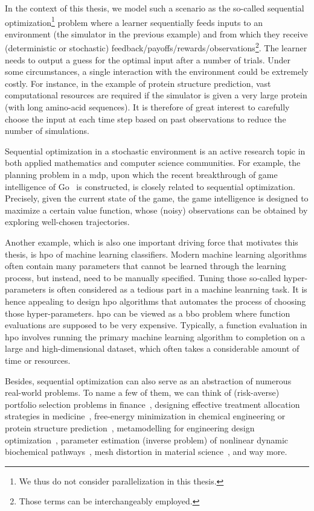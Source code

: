 In the context of this thesis, we model such a scenario as the so-called \gls{sequential optimization}\footnote{We thus do not consider parallelization in this thesis.} problem where a learner sequentially feeds inputs to an environment (the simulator in the previous example) and from which they receive (deterministic or stochastic) feedback/payoffs/rewards/observations\footnote{Those terms can be interchangeably employed.}. The learner needs to output a guess for the optimal input after a number of trials. Under some circumstances, a single interaction with the environment could be extremely costly. For instance, in the example of protein structure prediction, vast computational resources are required if the simulator is given a very large protein (with long amino-acid sequences). It is therefore of great interest to carefully choose the input at each time step based on past observations to reduce the number of simulations.

Sequential optimization in a stochastic environment is an active research topic in both applied mathematics and computer science communities. For example, the planning problem in a \gls{mdp}, upon which the recent breakthrough of game intelligence of Go~\citep{silver2016alphago} is constructed, is closely related to sequential optimization. Precisely, given the current state of the game, the game intelligence is designed to maximize a certain value function, whose (noisy) observations can be obtained by exploring well-chosen trajectories.

Another example, which is also one important driving force that motivates this thesis, is \gls{hpo} of machine learning classifiers. Modern machine learning algorithms often contain many parameters that cannot be learned through the learning process, but instead, need to be manually specified. Tuning those so-called \gls{hyper-parameters} is often considered as a tedious part in a machine leanrning task. It is hence appealing to design \gls{hpo} algorithms that automates the process of choosing those hyper-parameters. \gls{hpo} can be viewed as a \gls{bbo} problem where function evaluations are supposed to be very expensive. Typically, a function evaluation in \gls{hpo} involves running the primary machine learning algorithm to completion on a large and high-dimensional dataset, which often takes a considerable amount of time or resources.

Besides, sequential optimization can also serve as an abstraction of numerous real-world problems. To name a few of them, we can think of (risk-averse) portfolio selection problems in finance~\citep{ziemba2010}, designing effective treatment allocation strategies in medicine~\citep{durand2018contextual}, free-energy minimization in chemical engineering or protein structure prediction~\citep{floudas2000}, metamodelling for engineering design optimization~\citep{wang2007}, parameter estimation (inverse problem) of nonlinear dynamic biochemical pathways~\citep{moles2003}, mesh distortion in material science~\citep{charpagne2019ebsd}, and way more. 

